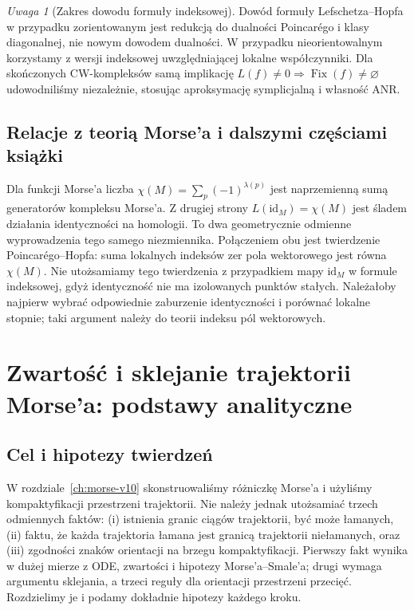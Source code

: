 \documentclass[11pt,a4paper,oneside]{report}
\newcommand{\id}{\mathrm{id}}
\theoremstyle{plain}
\theoremstyle{definition}
\theoremstyle{remark}
\newtheorem{uwaga}[twierdzenie]{Uwaga}
\begin{document}
\begin{uwaga}[Zakres dowodu formuły indeksowej]
Dowód formuły Lefschetza--Hopfa w przypadku zorientowanym
jest redukcją do dualności Poincarégo i klasy diagonalnej,
nie nowym dowodem dualności. W przypadku nieorientowalnym
korzystamy z wersji indeksowej uwzględniającej lokalne
współczynniki. Dla skończonych CW-kompleksów samą
implikację $L(f)\ne0\Rightarrow\operatorname{Fix}(f)\ne\varnothing$
udowodniliśmy niezależnie, stosując aproksymację
symplicjalną i własność ANR.
\end{uwaga}

\section{Relacje z teorią Morse'a i dalszymi częściami książki}
Dla funkcji Morse'a liczba $\chi(M)=\sum_p(-1)^{\lambda(p)}$
jest naprzemienną sumą generatorów kompleksu Morse'a.
Z drugiej strony $L(\id_M)=\chi(M)$ jest śladem działania
identyczności na homologii. To dwa geometrycznie odmienne
wyprowadzenia tego samego niezmiennika. Połączeniem obu
jest twierdzenie Poincarégo--Hopfa: suma lokalnych indeksów
zer pola wektorowego jest równa $\chi(M)$.
Nie utożsamiamy tego twierdzenia z przypadkiem mapy
$\id_M$ w formule indeksowej, gdyż identyczność nie
ma izolowanych punktów stałych. Należałoby najpierw
wybrać odpowiednie zaburzenie identyczności i porównać
lokalne stopnie; taki argument należy do teorii indeksu
pól wektorowych.



\chapter{Zwartość i sklejanie trajektorii Morse'a: podstawy analityczne}
\label{ch:morse-analytic-v11}

\section{Cel i hipotezy twierdzeń}
W rozdziale~\ref{ch:morse-v10} skonstruowaliśmy różniczkę
Morse'a i użyliśmy kompaktyfikacji przestrzeni trajektorii.
Nie należy jednak utożsamiać trzech odmiennych faktów:
(i) istnienia granic ciągów trajektorii, być może łamanych,
(ii) faktu, że każda trajektoria łamana jest granicą trajektorii
niełamanych, oraz (iii) zgodności znaków orientacji na
brzegu kompaktyfikacji. Pierwszy fakt wynika w dużej mierze
z ODE, zwartości i hipotezy Morse'a--Smale'a; drugi wymaga
argumentu sklejania, a trzeci reguły dla orientacji
przestrzeni przecięć. Rozdzielimy je i podamy dokładnie
hipotezy każdego kroku.
\end{document}
